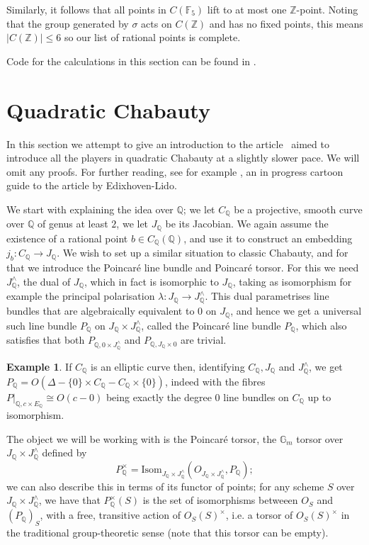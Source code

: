 \documentclass[12pt]{article}
\newcommand{\Z}{\mathbb{Z}}
\renewcommand{\G}{\mathbb{G}}
\newcommand{\Q}{\mathbb{Q}}
\newcommand{\F}{\mathbb{F}}
\theoremstyle{plain}
\theoremstyle{definition}
\newtheorem{exmp}[thm]{Example} %
\theoremstyle{remark}
\begin{document}
Similarly, it follows that all points in $C(\F_5)$ lift to at most one $\Z$-point. Noting that the group generated by $\sigma$ acts on $C(\Z)$ and has no fixed points, this means $|C(\Z)| \leq 6$ so our list of rational points is complete.

Code for the calculations in this section can be found in \citep{spelier2020}.

\section{Quadratic Chabauty}
\label{section:quadratic}
In this section we attempt to give an introduction to the article~\citep{edixhoven20} aimed to introduce all the players in quadratic Chabauty at a slightly slower pace. We will omit any proofs. For further reading, see for example \citep{hashimoto20}, an in progress cartoon guide to the article by Edixhoven-Lido.

We start with explaining the idea over $\Q$; we let $C_\Q$ be a projective, smooth curve over $\Q$ of genus at least $2$, we let $J_\Q$ be its Jacobian. We again assume the existence of a rational point $b \in C_\Q(\Q)$, and use it to construct an embedding $j_b : C_\Q \to J_\Q$. We wish to set up a similar situation to classic Chabauty, and for that we introduce the Poincar\'e line bundle and Poincar\'e torsor. For this we need $J_\Q^\wedge$, the dual of $J_\Q$, which in fact is isomorphic to $J_\Q$, taking as isomorphism for example the principal polarisation $\lambda: J_\Q \to J_\Q^\wedge$. This dual parametrises line bundles that are algebraically equivalent to $0$ on $J_\Q$, and hence we get a universal such line bundle $P_\Q$ on $J_\Q \times J_\Q^\wedge$, called the Poincar\'e line bundle $P_\Q$, which also satisfies that both $P_{\Q,0\times J_\Q^\wedge}$ and $P_{\Q,J_\Q \times 0}$ are trivial.

\begin{exmp}
If $C_\Q$ is an elliptic curve then, identifying $C_\Q,J_\Q$ and $J_\Q^{\wedge}$, we get $P_\Q = O(\Delta-\{0\} \times C_\Q - C_\Q \times \{0\})$, indeed with the fibres $P|_{\Q,c \times E_\Q} \cong O(c-0)$ being exactly the degree $0$ line bundles on $C_\Q$ up to isomorphism.
\end{exmp}

The object we will be working with is the Poincar\'e torsor, the $\G_m$ torsor over $J_\Q \times J_\Q^\wedge$ defined by \[
P_\Q^\times = \text{Isom}_{J_\Q \times J^\wedge_\Q}(O_{J_\Q \times J^\wedge_\Q},P_\Q);
\] 
we can also describe this in terms of its functor of points; for any scheme $S$ over $J_\Q \times J^\wedge_\Q$, we have that $P^\times_\Q(S)$ is the set of isomorphisms betweeen $O_S$ and $(P_\Q)_S$, with a free, transitive action of $O_S(S)^\times$, i.e. a torsor of $O_S(S)^\times$ in the traditional group-theoretic sense (note that this torsor can be empty).
\end{document}
